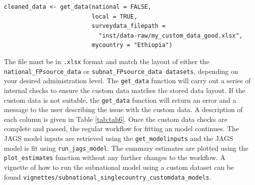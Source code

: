 \begin{verbatim}
cleaned_data <- get_data(national = FALSE, 
                         local = TRUE, 
                         surveydata_filepath = 
                           "inst/data-raw/my_custom_data_good.xlsx",
                         mycountry = "Ethiopia")
\end{verbatim}

The file must be in \texttt{.xlsx} format and match the layout of either the \texttt{national\_FPsource\_data} or \texttt{subnat\_FPsource\_data\ datasets}, depending on your desired administration level. The \texttt{get\_data} function will carry out a series of internal checks to ensure the custom data matches the stored data layout. If the custom data is not suitable, the \texttt{get\_data} function will return an error and a message to the user describing the issue with the custom data. A description of each column is given in Table \ref{tab:tab6}. Once the custom data checks are complete and passed, the regular workflow for fitting an  model continues. The JAGS model inputs are retrieved using the \texttt{get\_modelinputs} and the JAGS model is fit using \texttt{run\_jags\_model}. The summary estimates are plotted using the \texttt{plot\_estimates} function without any further changes to the workflow. A vignette of how to run the subnational model using a custom dataset can be found \texttt{vignettes/subnational\_singlecountry\_customdata\_models}.

